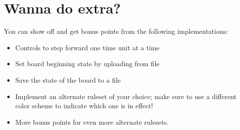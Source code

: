 \documentclass{42-en}
\begin{document}

\chapter{Wanna do extra?}

You can show off and get bonus points from the following implementations:
\begin{itemize}
	\item Controls to step forward one time unit at a time
	\item Set board beginning state by uploading from file
	\item Save the state of the board to a file
	\item Implement an alternate ruleset of your choice; make sure to use a different color scheme to indicate which one is in effect!
	\item More bonus points for even more alternate rulesets.
\end{itemize}
\end{document}

